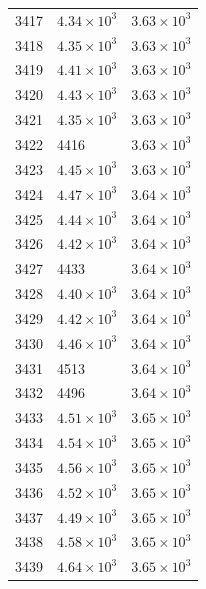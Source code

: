 \begin{table}[H]
\begin{tabular}{lll}
3417 & $\displaystyle 4.34 \times 10^{3}$ & $\displaystyle 3.63 \times 10^{3}$ \\
3418 & $\displaystyle 4.35 \times 10^{3}$ & $\displaystyle 3.63 \times 10^{3}$ \\
3419 & $\displaystyle 4.41 \times 10^{3}$ & $\displaystyle 3.63 \times 10^{3}$ \\
3420 & $\displaystyle 4.43 \times 10^{3}$ & $\displaystyle 3.63 \times 10^{3}$ \\
3421 & $\displaystyle 4.35 \times 10^{3}$ & $\displaystyle 3.63 \times 10^{3}$ \\
3422 & 4416 & $\displaystyle 3.63 \times 10^{3}$ \\
3423 & $\displaystyle 4.45 \times 10^{3}$ & $\displaystyle 3.63 \times 10^{3}$ \\
3424 & $\displaystyle 4.47 \times 10^{3}$ & $\displaystyle 3.64 \times 10^{3}$ \\
3425 & $\displaystyle 4.44 \times 10^{3}$ & $\displaystyle 3.64 \times 10^{3}$ \\
3426 & $\displaystyle 4.42 \times 10^{3}$ & $\displaystyle 3.64 \times 10^{3}$ \\
3427 & 4433 & $\displaystyle 3.64 \times 10^{3}$ \\
3428 & $\displaystyle 4.40 \times 10^{3}$ & $\displaystyle 3.64 \times 10^{3}$ \\
3429 & $\displaystyle 4.42 \times 10^{3}$ & $\displaystyle 3.64 \times 10^{3}$ \\
3430 & $\displaystyle 4.46 \times 10^{3}$ & $\displaystyle 3.64 \times 10^{3}$ \\
3431 & 4513 & $\displaystyle 3.64 \times 10^{3}$ \\
3432 & 4496 & $\displaystyle 3.64 \times 10^{3}$ \\
3433 & $\displaystyle 4.51 \times 10^{3}$ & $\displaystyle 3.65 \times 10^{3}$ \\
3434 & $\displaystyle 4.54 \times 10^{3}$ & $\displaystyle 3.65 \times 10^{3}$ \\
3435 & $\displaystyle 4.56 \times 10^{3}$ & $\displaystyle 3.65 \times 10^{3}$ \\
3436 & $\displaystyle 4.52 \times 10^{3}$ & $\displaystyle 3.65 \times 10^{3}$ \\
3437 & $\displaystyle 4.49 \times 10^{3}$ & $\displaystyle 3.65 \times 10^{3}$ \\
3438 & $\displaystyle 4.58 \times 10^{3}$ & $\displaystyle 3.65 \times 10^{3}$ \\
3439 & $\displaystyle 4.64 \times 10^{3}$ & $\displaystyle 3.65 \times 10^{3}$ \\

\end{tabular}
\end{table}
